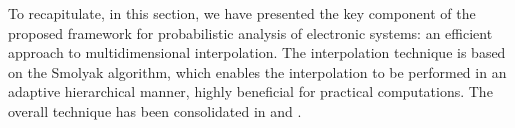 To recapitulate, in this section, we have presented the key component of the
proposed framework for probabilistic analysis of electronic systems: an
efficient approach to multidimensional interpolation. The interpolation
technique is based on the Smolyak algorithm, which enables the interpolation to
be performed in an adaptive hierarchical manner, highly beneficial for practical
computations. The overall technique has been consolidated in 
and .
